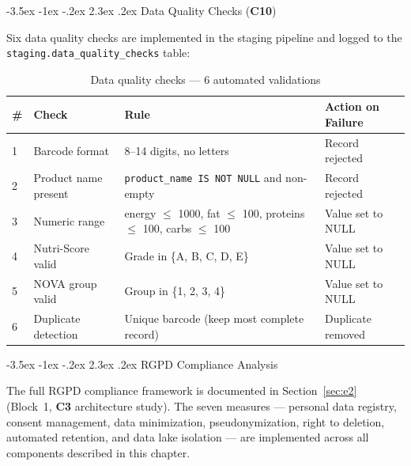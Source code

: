 \documentclass[a4paper,11pt,oneside,openany]{report}
\makeatletter
\renewcommand\section{\@startsection{section}{1}{\z@}%
  {-3.5ex \@plus -1ex \@minus -.2ex}%
  {2.3ex \@plus.2ex}%
  {\normalfont\Large\bfseries\color{ntgreen}}}
\newcommand{\competence}[1]{\textbf{\textcolor{ntgreen}{#1}}}
\newcommand{\rgpd}{RGPD}
\makeatother
\begin{document}
\section{Data Quality Checks (\competence{C10})}
\label{sec:dq}

Six data quality checks are implemented in the staging pipeline and logged
to the \texttt{staging.data\_quality\_checks} table:

\begin{table}[H]
\centering
\caption{Data quality checks --- 6 automated validations}
\label{tab:dq-checks}
\begin{tabularx}{\textwidth}{C{0.5cm} L{3cm} L{4cm} L{5cm}}
\toprule
\textbf{\#} & \textbf{Check} & \textbf{Rule} & \textbf{Action on Failure} \\
 & Barcode format & 8--14 digits, no letters & Record rejected \\
2 & Product name present & \texttt{product\_name IS NOT NULL} and non-empty & Record rejected \\
3 & Numeric range & energy $\leq$ 1000, fat $\leq$ 100, proteins $\leq$ 100, carbs $\leq$ 100 & Value set to NULL \\
4 & Nutri-Score valid & Grade in \{A, B, C, D, E\} & Value set to NULL \\
5 & NOVA group valid & Group in \{1, 2, 3, 4\} & Value set to NULL \\
6 & Duplicate detection & Unique barcode (keep most complete record) & Duplicate removed \\
\bottomrule
\end{tabularx}
\end{table}


\section{\rgpd{} Compliance Analysis}
\label{sec:rgpd-e4}

The full \rgpd{} compliance framework is documented in
Section~\ref{sec:e2} (Block~1, \competence{C3} architecture study). The
seven measures --- personal data registry, consent management, data
minimization, pseudonymization, right to deletion, automated retention, and
data lake isolation --- are implemented across all components described in
this chapter.


\end{document}
